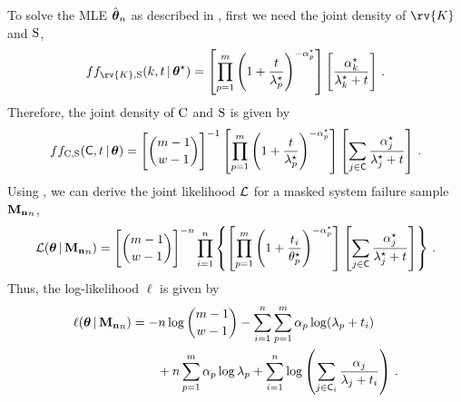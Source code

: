 \documentclass[
    11pt,
    extrafontsizes,
    article,
    oldfontcommands,
    final,
    oneside,
    openany,
    hidelinks]{memoir}
\begin{document}
To solve the MLE $\hat{\boldsymbol{\mathbf{\theta}}}_n$ as described in , first we need the joint density of $\rv{K}$ and $\mathrm{S}$,
\begin{equation}
\pdf{f_{\rv{K}, \sv}}(k, t \given \tparam{\vec\theta}) =
    \left [
        \prod_{p=1}^{m}
        \left (
            1 + \frac{t}{\tparam{\lambda}_p}
        \right )^{-\tparam{\alpha}_p}
    \right ]
    \left [
        \frac{\tparam{\alpha}_k}{\tparam{\lambda}_k + t}
    \right ]\,.
\end{equation}
Therefore, the joint density of $\mathrm{C}$ and $\mathrm{S}$ is given by
\begin{equation}
\label{eq:par_joint_cand_density}
\pdf{f_{\rvcand, \sv}}(\cand, t \given \vec\theta) =
    \left [ {{m-1} \choose {w-1}} \right ]^{-1}
    \left [
        \prod_{p=1}^{m}
        \left (
            1 + \frac{t}{\tparam{\lambda}_p}
        \right )^{-\tparam{\alpha}_p}
    \right ]
    \left [
        \sum_{j \in \cand} \frac{\tparam{\alpha}_j}{\tparam{\lambda}_j + t}
    \right ]\,.
\end{equation}
Using , we can derive the joint likelihood $\operatorname{\mathcal{L}}$ for a masked system failure sample $\boldsymbol{\mathbf{M_n}}_n$,
\begin{equation}
\likelihood(\vec\theta \given \mfs_n) =
    \left [ {{m-1} \choose {w-1}} \right ]^{-n}
    \prod_{i=1}^{n}
    \left \{
        \left [
            \prod_{p=1}^{m}
            \left (
                1 + \frac{t_i}{\tparam{\theta}_p}
            \right )^{-\tparam{\alpha}_p}
        \right ]
        \left [
            \sum_{j \in \cand} \frac{\tparam{\alpha}_j}{\tparam{\lambda}_j + t}
        \right ]
    \right \}\,.
\end{equation}
Thus, the log-likelihood $\ell$ is given by
\begin{equation}
\begin{split}
    \ell(\vec{\theta} \given \mfs_n) &=
        -n \log {{m-1} \choose {w-1}}
        -\sum_{i=1}^{n} \sum_{p=1}^{m} \alpha_p \log(\lambda_p + t_i)\\
        &\qquad + n \sum_{p=1}^{m} \alpha_p \log \lambda_p
        + \sum_{i=1}^{n} \log \left ( \sum_{j \in \cand_i}
        \frac{\alpha_j}{\lambda_j + t_i} \right )\,.
\end{split}
\end{equation}
\end{document}
